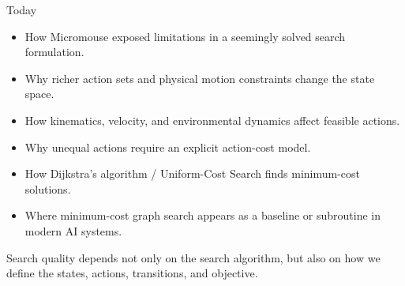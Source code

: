 \documentclass[aspectratio=169,10pt]{beamer}
\begin{document}
\makedecktitle

\begin{frame}[shrink=20]{Today}
  \begin{itemize}
    \item How Micromouse exposed limitations in a seemingly solved search formulation.
    \item Why richer action sets and physical motion constraints change the state space.
    \item How kinematics, velocity, and environmental dynamics affect feasible actions.
    \item Why unequal actions require an explicit action-cost model.
    \item How Dijkstra's algorithm / Uniform-Cost Search finds minimum-cost solutions.
    \item Where minimum-cost graph search appears as a baseline or subroutine in modern AI systems.
  \end{itemize}

  \begin{keyidea}
    Search quality depends not only on the search algorithm, but also on how we define the states, actions, transitions, and objective.
  \end{keyidea}
\end{frame}

\end{document}
